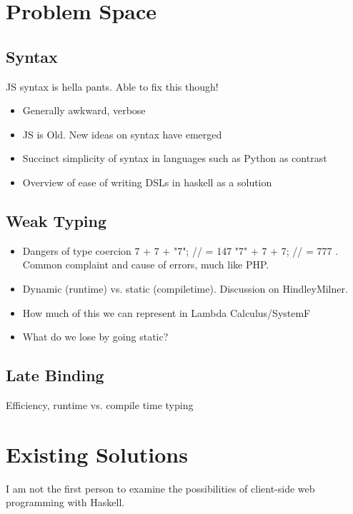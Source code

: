 \documentclass[11pt]{article}
\begin{document}
\section{Problem Space}

\subsection{Syntax}
JS syntax is hella pants. Able to fix this though!
\begin{itemize}
\item Generally awkward, verbose
\item JS is Old. New ideas on syntax have emerged
\item Succinct simplicity of syntax in languages such as Python as contrast
\item Overview of ease of writing DSLs in haskell as a solution
\end{itemize}


\subsection{Weak Typing}
\begin{itemize}
\item Dangers of type coercion 7 + 7 + "7"; // = 147  "7" + 7 + 7; // = 777 . 
	  Common complaint and cause of errors, much like PHP.
\item Dynamic (runtime) vs. static (compiletime). Discussion on HindleyMilner.
\item How much of this we can represent in Lambda Calculus/SystemF
\item What do we lose by going static?
\end{itemize}



\subsection{Late Binding}
Efficiency, runtime vs. compile time typing

\pagebreak

\section{Existing Solutions}
I am not the first person to examine the possibilities of client-side web
programming with Haskell.  
\end{document}
